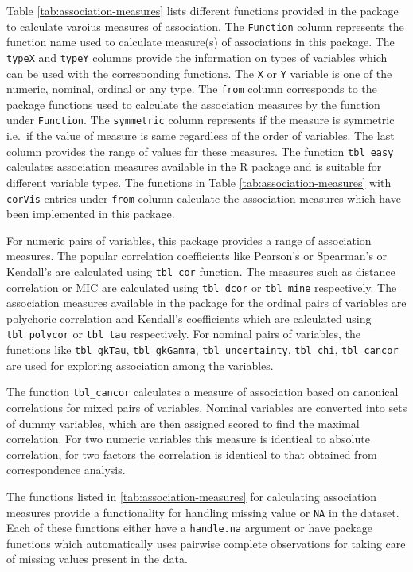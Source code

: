 Table \ref{tab:association-measures} lists different functions provided
in the package to calculate varoius measures of association. The
\texttt{Function} column represents the function name used to calculate
measure(s) of associations in this package. The \texttt{typeX} and
\texttt{typeY} columns provide the information on types of variables
which can be used with the corresponding functions. The \texttt{X} or
\texttt{Y} variable is one of the numeric, nominal, ordinal or any type.
The \texttt{from} column corresponds to the package functions used to
calculate the association measures by the function under
\texttt{Function}. The \texttt{symmetric} column represents if the
measure is symmetric i.e.~if the value of measure is same regardless of
the order of variables. The last column provides the range of values for
these measures. The function \texttt{tbl\_easy} calculates association
measures available in the R package  and is
suitable for different variable types. The functions in Table
\ref{tab:association-measures} with \texttt{corVis} entries under
\texttt{from} column calculate the association measures which have been
implemented in this package.

For numeric pairs of variables, this package provides a range of
association measures. The popular correlation coefficients like
Pearson's or Spearman's or Kendall's are calculated using
\texttt{tbl\_cor} function. The measures such as distance correlation or
MIC are calculated using \texttt{tbl\_dcor} or \texttt{tbl\_mine}
respectively. The association measures available in the package for the
ordinal pairs of variables are polychoric correlation and Kendall's
coefficients which are calculated using \texttt{tbl\_polycor} or
\texttt{tbl\_tau} respectively. For nominal pairs of variables, the
functions like \texttt{tbl\_gkTau}, \texttt{tbl\_gkGamma},
\texttt{tbl\_uncertainty}, \texttt{tbl\_chi}, \texttt{tbl\_cancor} are
used for exploring association among the variables.

The function \texttt{tbl\_cancor} calculates a measure of association
based on canonical correlations for mixed pairs of variables. Nominal
variables are converted into sets of dummy variables, which are then
assigned scored to find the maximal correlation. For two numeric
variables this measure is identical to absolute correlation, for two
factors the correlation is identical to that obtained from
correspondence analysis.

The functions listed in \ref{tab:association-measures} for calculating
association measures provide a functionality for handling missing value
or \texttt{NA} in the dataset. Each of these functions either have a
\texttt{handle.na} argument or have package functions which
automatically uses pairwise complete observations for taking care of
missing values present in the data.

